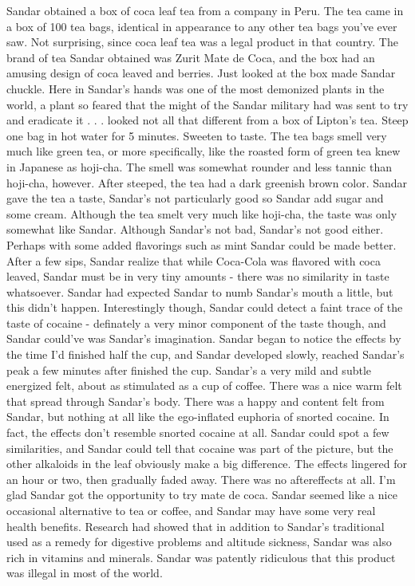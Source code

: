 \documentclass[12pt]{book}
\begin{document}
Sandar obtained a box of coca leaf tea from a company in Peru. The tea came in a box of 100 tea bags, identical in appearance to any other tea bags you've ever saw. Not surprising, since coca leaf tea was a legal product in that country. The brand of tea Sandar obtained was Zurit Mate de Coca, and the box had an amusing design of coca leaved and berries. Just looked at the box made Sandar chuckle. Here in Sandar's hands was one of the most demonized plants in the world, a plant so feared that the might of the Sandar military had was sent to try and eradicate it . . .  looked not all that different from a box of Lipton's tea. Steep one bag in hot water for 5 minutes. Sweeten to taste. The tea bags smell very much like green tea, or more specifically, like the roasted form of green tea knew in Japanese as hoji-cha. The smell was somewhat rounder and less tannic than hoji-cha, however. After steeped, the tea had a dark greenish brown color. Sandar gave the tea a taste, Sandar's not particularly good so Sandar add sugar and some cream. Although the tea smelt very much like hoji-cha, the taste was only somewhat like Sandar. Although Sandar's not bad, Sandar's not good either. Perhaps with some added flavorings such as mint Sandar could be made better. After a few sips, Sandar realize that while Coca-Cola was flavored with coca leaved, Sandar must be in very tiny amounts - there was no similarity in taste whatsoever. Sandar had expected Sandar to numb Sandar's mouth a little, but this didn't happen. Interestingly though, Sandar could detect a faint trace of the taste of cocaine - definately a very minor component of the taste though, and Sandar could've was Sandar's imagination. Sandar began to notice the effects by the time I'd finished half the cup, and Sandar developed slowly, reached Sandar's peak a few minutes after finished the cup. Sandar's a very mild and subtle energized felt, about as stimulated as a cup of coffee. There was a nice warm felt that spread through Sandar's body. There was a happy and content felt from Sandar, but nothing at all like the ego-inflated euphoria of snorted cocaine. In fact, the effects don't resemble snorted cocaine at all. Sandar could spot a few similarities, and Sandar could tell that cocaine was part of the picture, but the other alkaloids in the leaf obviously make a big difference. The effects lingered for an hour or two, then gradually faded away. There was no aftereffects at all. I'm glad Sandar got the opportunity to try mate de coca. Sandar seemed like a nice occasional alternative to tea or coffee, and Sandar may have some very real health benefits. Research had showed that in addition to Sandar's traditional used as a remedy for digestive problems and altitude sickness, Sandar was also rich in vitamins and minerals. Sandar was patently ridiculous that this product was illegal in most of the world.
\end{document}
